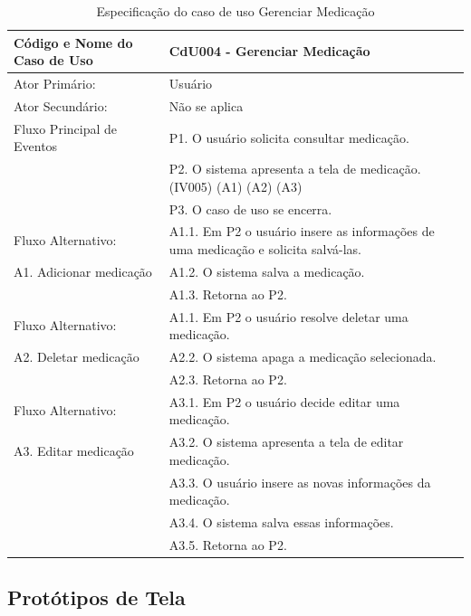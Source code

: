 \documentclass[12pt]{article}
\begin{document}
\begin{table}[!h]
	\begin{center}
		\caption{Especificação do caso de uso Gerenciar Medicação}
		\begin{tabular}{ | l |  p{10cm} |}
			\hline
			Código e Nome do Caso de Uso & CdU004 - Gerenciar Medicação \\ \hline
			Ator Primário: & Usuário \\ 
			Ator Secundário: & Não se aplica \\ \hline
			Fluxo Principal de Eventos & P1. O usuário solicita consultar medicação. \\
						   & P2. O sistema apresenta a tela de medicação. (IV005) (A1) (A2) (A3) \\
						   & P3. O caso de uso se encerra. \\ \hline
			Fluxo Alternativo:         & A1.1. Em P2 o usuário insere as informações de uma medicação e solicita salvá-las. \\
			A1. Adicionar medicação    & A1.2. O sistema salva a medicação. \\ 
						   & A1.3. Retorna ao P2. \\ \hline
			Fluxo Alternativo:         & A1.1. Em P2 o usuário resolve deletar uma medicação. \\
			A2. Deletar medicação      & A2.2. O sistema apaga a medicação selecionada. \\
						   & A2.3. Retorna ao P2. \\ \hline
			Fluxo Alternativo:         & A3.1. Em P2 o usuário decide editar uma medicação. \\
			A3. Editar medicação       & A3.2. O sistema apresenta a tela de editar medicação. \\
						   & A3.3. O usuário insere as novas informações da medicação. \\
						   & A3.4. O sistema salva essas informações. \\
						   & A3.5. Retorna ao P2. \\
			\hline
		\end{tabular}
	\end{center}
\end{table}

\newpage

\subsection{Protótipos de Tela}
\end{document}
